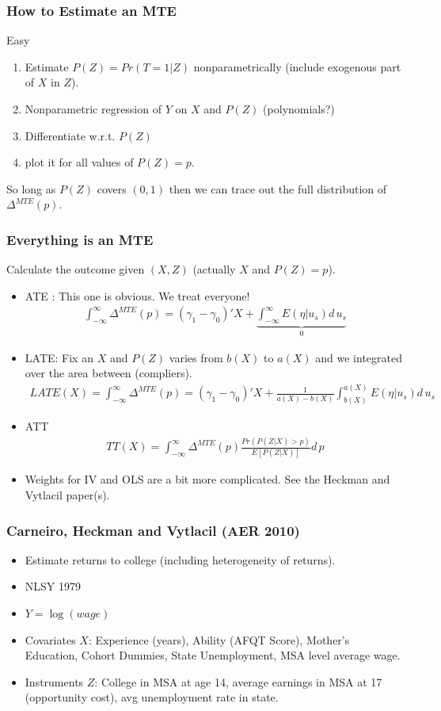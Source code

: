 \documentclass[xcolor=pdftex,dvipsnames,table,mathserif,aspectratio=169]{beamer}
\begin{document}
\begin{frame}
\frametitle{How to Estimate an MTE}
Easy
\begin{enumerate}
\item Estimate $P(Z) = Pr(T=1 | Z)$ nonparametrically (include exogenous part of $X$ in $Z$).
\item Nonparametric regression of $Y$ on $X$ and $P(Z)$ (polynomials?)
\item Differentiate w.r.t. $P(Z)$
\item plot it for all values of $P(Z)=p$.
\end{enumerate}
So long as $P(Z)$ covers $(0,1)$ then we can trace out the full distribution of $\Delta^{MTE}(p)$.
\end{frame}



\begin{frame}
\footnotesize
\frametitle{Everything is an MTE}
Calculate the outcome given $(X,Z)$ (actually $X$ and $P(Z)=p$).
\begin{itemize}
\item ATE : This one is obvious. We treat everyone!
\begin{eqnarray*}
\int_{-\infty}^{\infty} \Delta^{MTE}(p) = (\gamma_1 - \gamma_0)'X + \underbrace{\int_{-\infty}^{\infty} E(\eta | u_s) d\, u_s}_{0}
\end{eqnarray*}
\item LATE: Fix an $X$ and $P(Z)$ varies from $b(X)$ to $a(X)$ and we integrated over the area between (compliers).
\begin{eqnarray*}
LATE(X)=\int_{-\infty}^{\infty} \Delta^{MTE}(p) =  (\gamma_1 - \gamma_0)'X + \frac{1}{a(X)-b(X)} \int_{b(X)}^{a(X)} E(\eta | u_s) d\, u_s
\end{eqnarray*}

\item ATT 
\begin{eqnarray*}
TT(X)=\int_{-\infty}^{\infty} \Delta^{MTE}(p) \frac{Pr(P(Z | X) > p)}{E[P(Z | X)]} d\,p
\end{eqnarray*}

\item Weights for IV and OLS are a bit more complicated. See the Heckman and Vytlacil paper(s).
\end{itemize}
\end{frame}

\begin{frame}
\frametitle{Carneiro, Heckman and Vytlacil (AER 2010)}
\begin{itemize}
\item Estimate returns to college (including heterogeneity of returns).
\item NLSY 1979
\item $Y = \log(wage)$
\item Covariates $X$: Experience (years), Ability (AFQT Score), Mother's Education, Cohort Dummies, State Unemployment, MSA level average wage.
\item Instruments $Z$: College in MSA at age 14, average earnings in MSA at 17 (opportunity cost), avg unemployment rate in state.
\end{itemize}
\end{frame}
\end{document}
